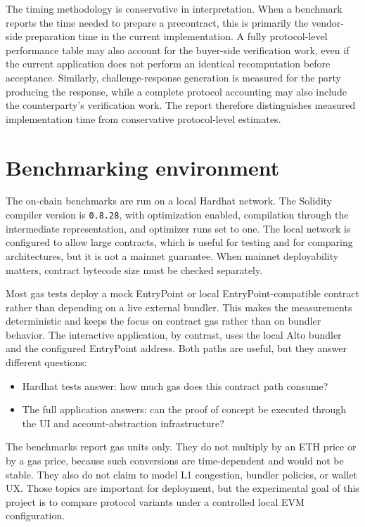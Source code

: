 The timing methodology is conservative in interpretation. When a benchmark reports the time
needed to prepare a precontract, this is primarily the vendor-side preparation time in the
current implementation. A fully protocol-level performance table may also account for the
buyer-side verification work, even if the current application does not perform an identical
recomputation before acceptance. Similarly, challenge-response generation is measured for
the party producing the response, while a complete protocol accounting may also include the
counterparty's verification work. The report therefore distinguishes measured implementation
time from conservative protocol-level estimates.

\section{Benchmarking environment}

The on-chain benchmarks are run on a local Hardhat network. The Solidity compiler version is
\texttt{0.8.28}, with optimization enabled, compilation through the intermediate
representation, and optimizer runs set to one. The local network is configured to allow large
contracts, which is useful for testing and for comparing architectures, but it is not a
mainnet guarantee. When mainnet deployability matters, contract bytecode size must be checked
separately.

Most gas tests deploy a mock EntryPoint or local EntryPoint-compatible contract rather than
depending on a live external bundler. This makes the measurements deterministic and keeps the
focus on contract gas rather than on bundler behavior. The interactive application, by
contrast, uses the local Alto bundler and the configured EntryPoint address. Both paths are
useful, but they answer different questions:

\begin{itemize}
  \item Hardhat tests answer: how much gas does this contract path consume?
  \item The full application answers: can the proof of concept be executed through the UI and
  account-abstraction infrastructure?
\end{itemize}

The benchmarks report gas units only. They do not multiply by an ETH price or by a gas price,
because such conversions are time-dependent and would not be stable. They also do not claim
to model L1 congestion, bundler policies, or wallet UX. Those topics are important for
deployment, but the experimental goal of this project is to compare protocol variants under
a controlled local EVM configuration.

